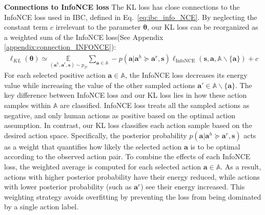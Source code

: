 \textbf{Connections to InfoNCE loss} The KL loss has close connections to the InfoNCE loss used in IBC, defined in Eq.~\eqref{eq:ibc_info_NCE}.
By neglecting the constant term $c$ irrelevant to the parameter $\bm \theta$, our KL loss can be reorganized as a weighted sum of the InfoNCE loss({See Appendix \ref{appendix:connection_INFONCE}}):
\begin{align*}
    \ell_{\!KL}\!(\bm \theta) \!
   \simeq \!\!\!\!
    \!\!\!\! \underset{(\bm{a}^{h}\!, \bm{a}^{r}\!, \bm{s})  \sim p_{\mathcal D}}{\mathbb{E}} \!\! \sum_{\bm a \in \mathbb A} \!\! -p (\bm a|\bm a^h \!\succeq \! \bm a^r\!, \bm s) \ell_{\text{InfoNCE}}(\bm s, \bm a, \mathbb A \! \backslash  \! \{\bm a\}) \!\!+ \!c
\end{align*}
For each selected positive action $\bm a \in \mathbb{A}$, the InfoNCE loss decreases its energy value while increasing the value of the other sampled actions $\bm a' \in \mathbb{A} \backslash  \{\bm a \}$.
The key difference between InfoNCE loss and our KL loss lies in how these action samples within $\mathbb{A}$ are classified.
InfoNCE loss treats all the sampled actions as negative, and only human actions as positive based on the optimal action assumption. 
In contrast, our KL loss classifies each action sample based on the desired action space.
Specifically, the posterior probability $p (\bm a|\bm a^h \succeq \bm a^r, \bm s)$ acts as a weight that quantifies how likely the selected action $\bm a$ is to be optimal according to the observed action pair. 
To combine the effects of each InfoNCE loss, the weighted average is computed for each selected action $\bm a \in \mathbb{A}$.
As a result, actions with higher posterior probability have their energy reduced, while actions with lower posterior probability (such as $\bm a^r$) see their energy increased. 
 This weighting strategy avoids overfitting by preventing the loss from being dominated by a single action label. 


